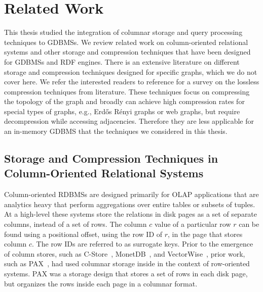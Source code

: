\chapter{Related Work}
\label{c:related-works}

This thesis studied the integration of columnar storage and query processing techniques to GDBMSs. We review related work on column-oriented relational systems and other storage and compression techniques that have been designed for GDBMSs and RDF engines. There is an extensive literature on different storage and compression techniques designed for specific graphs, which we do not cover here. We refer the interested readers to reference \cite{sahu:survey, besta2018survey} for a survey on the lossless compression techniques from literature. These techniques focus on compressing the topology of the graph and broadly can achieve high compression rates for special types of graphs, e.g., Erd\H{o}s R\'enyi graphs or web graphs, but require decompression while accessing adjacencies. Therefore they are less applicable for an in-memory GDBMS that the techniques we considered in this thesis.


\section{Storage and Compression Techniques in Column-Oriented Relational Systems}
\label{sec:column-stores-overview}

Column-oriented RDBMSs are designed primarily for OLAP applications that are analytics heavy that perform aggregations over entire tables or subsets of tuples. At a high-level these systems store the relations in disk pages as a set of separate columns, instead of a set of rows. The column $c$ value of a particular row $r$ can be found using a positional offset, using the row ID of $r$, in the page that stores column $c$. The row IDs are referred to as surrogate keys. Prior to the emergence of column stores, such as C-Store~\cite{c-store}, MonetDB~\cite{monetdb}, and VectorWise~\cite{boncz-vectorwise, boncz-vectorwise1},  prior work, such as PAX~\cite{pax}, had used columnar storage inside in the context of row-oriented systems. PAX was a storage design that stores a set of rows in each disk page, but organizes the rows inside each page in a columnar format. 

